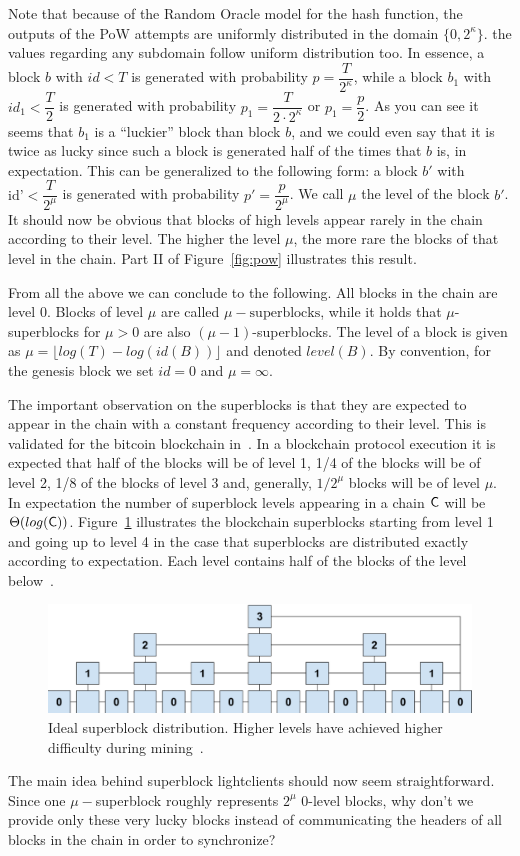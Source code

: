 Note that because of the Random Oracle model for the hash function, the outputs of the PoW attempts are uniformly distributed in the domain $\{0, 2^{\kappa} \}$. 
the values regarding any subdomain follow uniform distribution too. 
In essence, a block $b$ with $id < T$ is generated with probability $p = \dfrac{T}{2^\kappa}$, while a block $b_1$ with $id_1 < \dfrac{T}{2}$ is generated with probability $p_1 = \dfrac{T}{2 \cdot 2^\kappa} $ or $p_1 = \dfrac{p}{2}$. As you can see it seems that $b_1$ is a ``luckier'' block than block $b$, and we could even say that it is twice as lucky since such a block is generated half of the times that $b$ is, in expectation. This can be generalized to the following form: a block $b'$ with $\text{id'} < \dfrac{T}{2^\mu}$ is generated with probability $p' = \dfrac{p}{2^\mu}$. We call $\mu$ the level of the block $b'$.
It should now be obvious that blocks of high levels appear rarely in the chain according to their level. The higher the level $\mu$, the more rare the blocks of that level in the chain. Part II of Figure~\ref{fig:pow} illustrates this result.

From all the above we can conclude to the following. All blocks in the chain are level 0. Blocks of level $\mu$ are called $\mu-\text{superblocks}$, while it holds that $\mu$-superblocks for $\mu > 0$ are also $(\mu -1)$-superblocks. The level of a block is given as $\mu = \lfloor log(T) - log(id(B)) \rfloor$ and denoted $level(B)$. By convention, for the genesis block we set $id = 0$ and $\mu = \infty$.

The important observation on the superblocks is that they are expected to appear in the chain with a constant frequency according to their level. This is validated for the bitcoin blockchain in~\cite{compactsuperblocks}. In a blockchain protocol execution it is expected that half of the blocks will be of level 1, 1/4 of the blocks will be of level 2, 1/8 of the blocks of level 3 and, generally, $1 / 2^\mu$ blocks will be of level $\mu$. In expectation the number of superblock levels appearing in a chain $\mathsf{C}$ will be $\Theta(log(\mathsf{C}))$. Figure~\ref{fig:superblock_distribution} illustrates the blockchain superblocks starting from level 1 and going up to level 4 in the case that superblocks are distributed exactly according to expectation. Each level contains half of the blocks of the level below~\cite{nipopows}.

\begin{figure}[h!]
	\begin{center}
		\includegraphics[width=0.8\columnwidth]{figures/superblock-distribution.pdf}
	\end{center}
	\caption{Ideal superblock distribution. Higher levels have achieved higher difficulty during mining~\cite{nipopows}.}
	\label{fig:superblock_distribution}
\end{figure}

The main idea behind superblock lightclients should now seem straightforward. Since one $\mu-$superblock roughly represents $2^\mu$ 0-level blocks, why don't we provide only these very lucky blocks instead of communicating the headers of all blocks in the chain in order to synchronize?